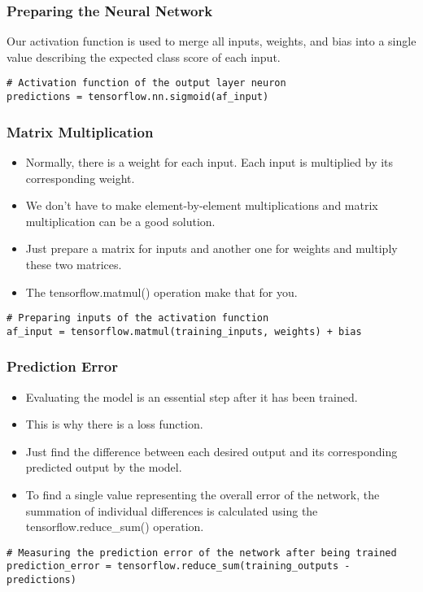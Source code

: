 \begin{frame}[fragile] \frametitle{Preparing the Neural Network }
Our activation function is used to merge all inputs, weights, and bias into a single value describing the expected class score of each input.
\begin{lstlisting}
# Activation function of the output layer neuron  
predictions = tensorflow.nn.sigmoid(af_input)  
\end{lstlisting}
\end{frame}

\begin{frame}[fragile] \frametitle{Matrix Multiplication}

\begin{itemize}
\item Normally, there is a weight for each input. Each input is multiplied by its corresponding weight. 
\item We don't have to make element-by-element multiplications and matrix multiplication can be a good solution.
\item Just prepare a matrix for inputs and another one for weights and multiply these two matrices. 
\item The tensorflow.matmul() operation make that for you.
\end{itemize}
\begin{lstlisting}
# Preparing inputs of the activation function  
af_input = tensorflow.matmul(training_inputs, weights) + bias  
\end{lstlisting}
\end{frame}

\begin{frame}[fragile] \frametitle{Prediction Error}

\begin{itemize}
\item Evaluating the model is an essential step after it has been trained. 
\item This is why there is a loss function.
\item Just find the difference between each desired output and its corresponding predicted output by the model. 
\item To find a single value representing the overall error of the network, the summation of individual differences is calculated using the tensorflow.reduce\_sum() operation.
\end{itemize}
\begin{lstlisting}
# Measuring the prediction error of the network after being trained  
prediction_error = tensorflow.reduce_sum(training_outputs - predictions)
\end{lstlisting}
\end{frame}

